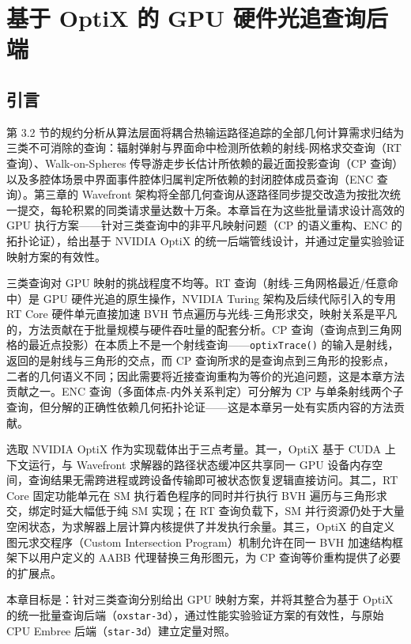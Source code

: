 
\chapter{基于 OptiX 的 GPU 硬件光追查询后端}
\label{chap:rt_backend}

\section{引言}

第 3.2 节的规约分析从算法层面将耦合热输运路径追踪的全部几何计算需求归结为三类不可消除的查询：辐射弹射与界面命中检测所依赖的射线-网格求交查询（RT 查询）、Walk-on-Spheres 传导游走步长估计所依赖的最近面投影查询（CP 查询）以及多腔体场景中界面事件腔体归属判定所依赖的封闭腔体成员查询（ENC 查询）。第三章的 Wavefront 架构将全部几何查询从逐路径同步提交改造为按批次统一提交，每轮积累的同类请求量达数十万条。本章旨在为这些批量请求设计高效的 GPU 执行方案——针对三类查询中的非平凡映射问题（CP 的语义重构、ENC 的拓扑论证），给出基于 NVIDIA OptiX 的统一后端管线设计，并通过定量实验验证映射方案的有效性。

三类查询对 GPU 映射的挑战程度不均等。RT 查询（射线-三角网格最近/任意命中）是 GPU 硬件光追的原生操作，NVIDIA Turing 架构及后续代际引入的专用 RT Core 硬件单元直接加速 BVH 节点遍历与光线-三角形求交，映射关系是平凡的，方法贡献在于批量规模与硬件吞吐量的配套分析。CP 查询（查询点到三角网格的最近点投影）在本质上不是一个射线查询——\texttt{optixTrace()} 的输入是射线，返回的是射线与三角形的交点，而 CP 查询所求的是查询点到三角形的投影点，二者的几何语义不同；因此需要将近接查询重构为等价的光追问题，这是本章方法贡献之一。ENC 查询（多面体点-内外关系判定）可分解为 CP 与单条射线两个子查询，但分解的正确性依赖几何拓扑论证——这是本章另一处有实质内容的方法贡献。

选取 NVIDIA OptiX 作为实现载体出于三点考量。其一，OptiX 基于 CUDA 上下文运行，与 Wavefront 求解器的路径状态缓冲区共享同一 GPU 设备内存空间，查询结果无需跨进程或跨设备传输即可被状态恢复逻辑直接访问。其二，RT Core 固定功能单元在 SM 执行着色程序的同时并行执行 BVH 遍历与三角形求交，绑定时延大幅低于纯 SM 实现；在 RT 查询负载下，SM 并行资源仍处于大量空闲状态，为求解器上层计算内核提供了并发执行余量。其三，OptiX 的自定义图元求交程序（Custom Intersection Program）机制允许在同一 BVH 加速结构框架下以用户定义的 AABB 代理替换三角形图元，为 CP 查询等价重构提供了必要的扩展点。

本章目标是：针对三类查询分别给出 GPU 映射方案，并将其整合为基于 OptiX 的统一批量查询后端（\texttt{oxstar-3d}），通过性能实验验证方案的有效性，与原始 CPU Embree 后端（\texttt{star-3d}）建立定量对照。

